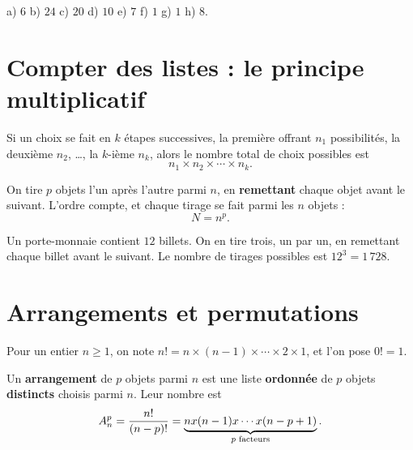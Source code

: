 \begin{corrige}[automatismes]
a) $6$ \quad b) $24$ \quad c) $20$ \quad d) $10$ \quad e) $7$ \quad
f) $1$ \quad g) $1$ \quad h) $8$.
\end{corrige}

\section{Compter des listes : le principe multiplicatif}

\begin{theoreme}
Si un choix se fait en $k$ étapes successives, la première offrant $n_{1}$
possibilités, la deuxième $n_{2}$, \dots, la $k$-ième $n_{k}$, alors le
nombre total de choix possibles est
\[
  n_{1}\times n_{2}\times\cdots\times n_{k}.
\]
\end{theoreme}

\begin{propriete}
On tire $p$ objets l'un après l'autre parmi $n$, en \textbf{remettant}
chaque objet avant le suivant. L'ordre compte, et chaque tirage se fait
parmi les $n$ objets :
\[
  N = n^{p}.
\]
\end{propriete}

\begin{exemple}
Un porte-monnaie contient $12$ billets. On en tire trois, un par un, en
remettant chaque billet avant le suivant. Le nombre de tirages possibles est
$12^{3} = 1\,728$.
\end{exemple}

\section{Arrangements et permutations}

\begin{definition}[factorielle]
Pour un entier $n \geq 1$, on note
$n! = n\times(n-1)\times\cdots\times2\times1$, et l'on pose $0! = 1$.
\end{definition}

\begin{definition}[arrangement]
Un \textbf{arrangement} de $p$ objets parmi $n$ est une liste
\textbf{ordonnée} de $p$ objets \textbf{distincts} choisis parmi $n$. Leur
nombre est
\[
  \arrang{p}{n} = \frac{n!}{(n-p)!}
  = \underbrace{n\times(n-1)\times\cdots\times(n-p+1)}_{p \text{ facteurs}} .
\]
\end{definition}

